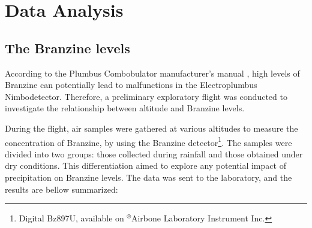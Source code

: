 \documentclass[english]{cenarticle} %
\begin{document}
\section{Data Analysis}
%
\subsection{The Branzine levels}
%
According to the Plumbus Combobulator manufacturer's manual \citep{PlumbusManual}, high levels of Branzine can potentially lead to malfunctions in the Electroplumbus Nimbodetector. Therefore, a preliminary exploratory flight was conducted to investigate the relationship between altitude and Branzine levels.\par
%
During the flight, air samples were gathered at various altitudes to measure the concentration of Branzine, by using the Branzine detector\footnote{Digital Bz897U, available on $^{\circledR}$Airbone Laboratory Instrument Inc.}. The samples were divided into two groups: those collected during rainfall and those obtained under dry conditions. This differentiation aimed to explore any potential impact of precipitation on Branzine levels.
%
The  data was sent to the laboratory, and the results are bellow summarized:
%
\end{document}
